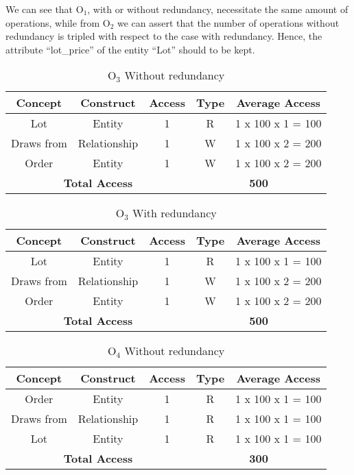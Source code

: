 We can see that $ \textrm{O}_\textrm{1} $, with or without redundancy, necessitate the same amount of operations, while from $ \textrm{O}_\textrm{2} $ we can assert that the number of operations without redundancy is tripled with respect to the case with redundancy. Hence, the attribute ``lot\_price'' of the entity ``Lot'' should to be kept.
\begin{table}[!h]\caption{	$ \textrm{O}_\textrm{3} $ Without redundancy }
	\begin{center}
		\begin{tabular}{| c | c | c | c | c |}
			\hline
			\textbf{Concept} & \textbf{Construct} & \textbf{Access} & \textbf{Type} & \textbf{Average Access} \\ \hline
			Lot & Entity & 1 & R & 1 x 100 x 1 = 100 \\ \hline
			Draws from & Relationship & 1 & W & 1 x 100 x 2 = 200 \\ \hline
			Order & Entity & 1 & W & 1 x 100 x 2 = 200 \\ \hline
			\multicolumn{3}{|c|}{\textbf{Total Access}} & \multicolumn{2}{|c|}{\textbf{500}} \\ \hline
		\end{tabular}
	\end{center}
\end{table}
\begin{table}[!h]\caption{	$ \textrm{O}_\textrm{3} $ With redundancy }
	\begin{center}
		\begin{tabular}{| c | c | c | c | c |}
			\hline
			\textbf{Concept} & \textbf{Construct} & \textbf{Access} & \textbf{Type} & \textbf{Average Access} \\ \hline
			Lot & Entity & 1 & R & 1 x 100 x 1 = 100 \\ \hline
			Draws from & Relationship & 1 & W & 1 x 100 x 2 = 200 \\ \hline
			Order & Entity & 1 & W & 1 x 100 x 2 = 200 \\ \hline
			\multicolumn{3}{|c|}{\textbf{Total Access}} & \multicolumn{2}{|c|}{\textbf{500}} \\ \hline
		\end{tabular}
	\end{center}
\end{table}
\begin{table}[!h]\caption{	$ \textrm{O}_\textrm{4} $ Without redundancy }
	\begin{center}
		\begin{tabular}{| c | c | c | c | c |}
			\hline
			\textbf{Concept} & \textbf{Construct} & \textbf{Access} & \textbf{Type} & \textbf{Average Access} \\ \hline
			Order & Entity & 1 & R & 1 x 100 x 1 = 100 \\ \hline
			Draws from & Relationship & 1 & R & 1 x 100 x 1 = 100 \\ \hline
			Lot & Entity & 1 & R & 1 x 100 x 1 = 100 \\ \hline
			\multicolumn{3}{|c|}{\textbf{Total Access}} & \multicolumn{2}{|c|}{\textbf{300}} \\ \hline
		\end{tabular}
	\end{center}
\end{table}
